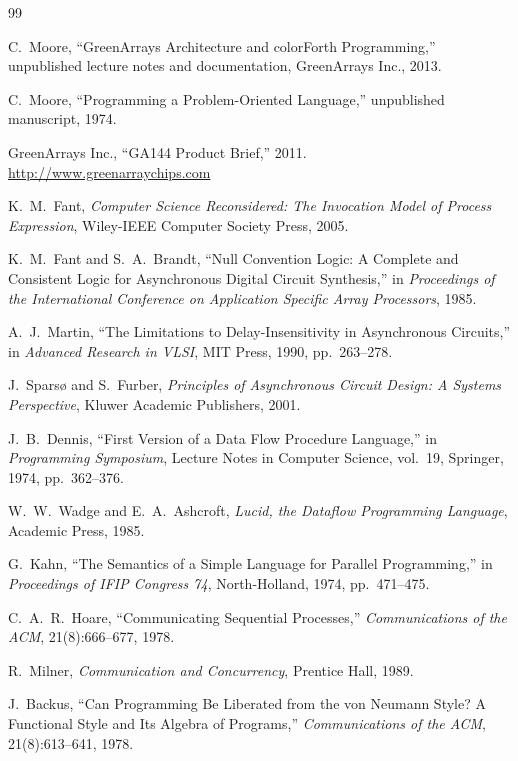 \documentclass[11pt, a4paper]{article}
\begin{document}
\begin{thebibliography}{99}

C.\ Moore, ``GreenArrays Architecture and colorForth Programming,''
unpublished lecture notes and documentation, GreenArrays Inc., 2013.

C.\ Moore, ``Programming a Problem-Oriented Language,''
unpublished manuscript, 1974.

GreenArrays Inc., ``GA144 Product Brief,'' 2011.
\url{http://www.greenarraychips.com}

K.\ M.\ Fant, \textit{Computer Science Reconsidered: The Invocation Model of
Process Expression}, Wiley-IEEE Computer Society Press, 2005.

K.\ M.\ Fant and S.\ A.\ Brandt, ``Null Convention Logic: A Complete and Consistent
Logic for Asynchronous Digital Circuit Synthesis,'' in \textit{Proceedings of the
International Conference on Application Specific Array Processors}, 1985.

A.\ J.\ Martin, ``The Limitations to Delay-Insensitivity in Asynchronous Circuits,''
in \textit{Advanced Research in VLSI}, MIT Press, 1990, pp.\ 263--278.

J.\ Spars{\o} and S.\ Furber, \textit{Principles of Asynchronous Circuit Design:
A Systems Perspective}, Kluwer Academic Publishers, 2001.

J.\ B.\ Dennis, ``First Version of a Data Flow Procedure Language,''
in \textit{Programming Symposium}, Lecture Notes in Computer Science, vol.\ 19,
Springer, 1974, pp.\ 362--376.

W.\ W.\ Wadge and E.\ A.\ Ashcroft, \textit{Lucid, the Dataflow Programming Language},
Academic Press, 1985.

G.\ Kahn, ``The Semantics of a Simple Language for Parallel Programming,''
in \textit{Proceedings of IFIP Congress 74}, North-Holland, 1974, pp.\ 471--475.

C.\ A.\ R.\ Hoare, ``Communicating Sequential Processes,''
\textit{Communications of the ACM}, 21(8):666--677, 1978.

R.\ Milner, \textit{Communication and Concurrency}, Prentice Hall, 1989.

J.\ Backus, ``Can Programming Be Liberated from the von Neumann Style?
A Functional Style and Its Algebra of Programs,''
\textit{Communications of the ACM}, 21(8):613--641, 1978.


\end{thebibliography}
\end{document}
